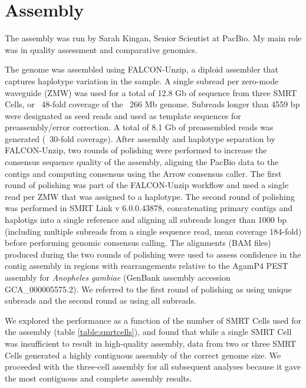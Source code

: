 \section{Assembly}

The assembly was run by Sarah Kingan, Senior Scientist at PacBio. My main role was in quality assessment and comparative genomics. \\

\par{
The genome was assembled using FALCON-Unzip, a diploid assembler that captures haplotype variation in the sample\cite{falcon}. A single subread per zero-mode waveguide (ZMW) was used for a total of 12.8 Gb of sequence from three SMRT Cells, or ~48-fold coverage of the ~266 Mb genome. Subreads longer than 4559 bp were designated as seed reads and used as template sequences for preassembly/error correction. A total of 8.1 Gb of preassembled reads was generated (~30-fold coverage). After assembly and haplotype separation by FALCON-Unzip, two rounds of polishing were performed to increase the consensus sequence quality of the assembly, aligning the PacBio data to the contigs and computing consensus using the Arrow consensus caller\cite{arrow}. The first round of polishing was part of the FALCON-Unzip workflow and used a single read per ZMW that was assigned to a haplotype. The second round of polishing was performed in SMRT Link v 6.0.0.43878, concatenating primary contigs and haplotigs into a single reference and aligning all subreads longer than 1000 bp (including multiple subreads from a single sequence read, mean coverage 184-fold) before performing genomic consensus calling. The alignments (BAM files) produced during the two rounds of polishing were used to assess confidence in the contig assembly in regions with rearrangements relative to the AgamP4 PEST assembly for \textit{Anopheles gambiae} (GenBank assembly accession GCA\_000005575.2)\cite{PEST}\cite{PEST2}. We referred to the first round of polishing as using unique subreads and the second round as using all subreads.
} 

\par{
We explored the performance as a function of the number of SMRT Cells used for the assembly (table \ref{table:smrtcells}), and found that while a single SMRT Cell was insufficient to result in high-quality assembly, data from two or three SMRT Cells generated a highly contiguous assembly of the correct genome size. We proceeded with the three-cell assembly for all subsequent analyses because it gave the most contiguous and complete assembly results.
}

